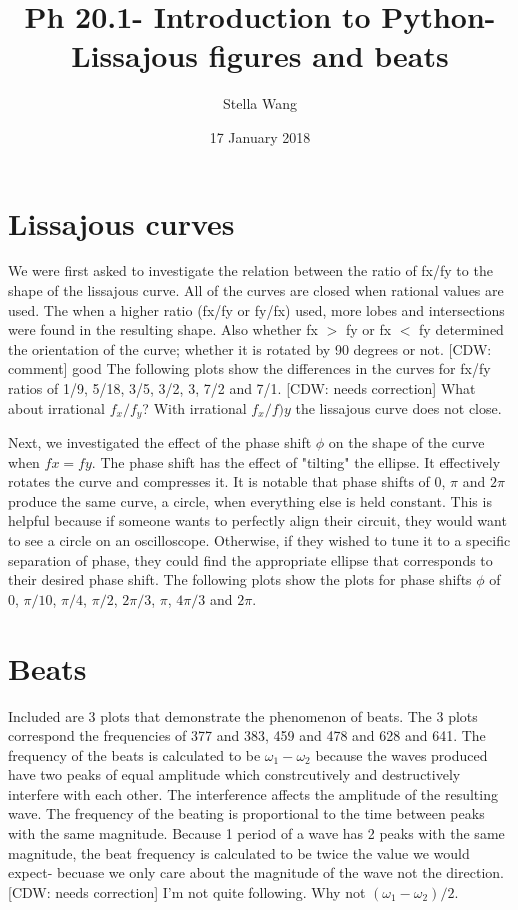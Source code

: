 \documentclass{article}
\title{Ph 20.1- Introduction to Python- Lissajous figures and beats
\\ \correct{}}
\author{Stella Wang}
\date{17 January 2018}
\newcommand{\cdw}[1]
           {{\color{blue} [CDW: comment] #1}}
\newcommand{\correct}[1]
           {{\color{red} [CDW: needs correction] #1}}
\begin{document}
	\maketitle
\section{Lissajous curves}
We were first asked to investigate the relation between the ratio of fx/fy to the shape of the lissajous curve. All of the curves are closed when rational values are used. The when a higher ratio (fx/fy or fy/fx) used, more lobes and intersections were found in the resulting shape. Also whether fx $>$ fy or fx $<$ fy determined the orientation of the curve; whether it is rotated by 90 degrees or not. \cdw{good} The following plots show the differences in the curves for fx/fy ratios of 1/9, 5/18, 3/5, 3/2, 3, 7/2 and 7/1.
\correct{What about irrational $f_x/f_y$?}
With irrational $f_x/f)y$ the lissajous curve does not close. 


Next, we investigated the effect of the phase shift $\phi$ on the shape of the curve when $fx=fy$. The phase shift has the effect of "tilting" the ellipse. It effectively rotates the curve and compresses it. It is notable that phase shifts of 0, $\pi$ and $2\pi$ produce the same curve, a circle, when everything else is held constant. This is helpful because if someone wants to perfectly align their circuit, they would want to see a circle on an oscilloscope. Otherwise, if they wished to tune it to a specific separation of phase, they could find the appropriate ellipse that corresponds to their desired phase shift. The following plots show the plots for phase shifts $\phi$ of 0, $\pi/10$, $\pi/4$, $\pi/2$, $2\pi/3$, $\pi$, $4\pi/3$ and $2\pi$.

 
 \section{Beats}
 Included are 3 plots that demonstrate the phenomenon of beats. The 3 plots correspond the frequencies of 377 and 383, 459 and 478 and 628 and 641. The frequency of the beats is calculated to be $\omega_1 - \omega_2$ because the waves produced have two peaks of equal amplitude which constrcutively and destructively interfere with each other. The interference affects the amplitude of the resulting wave. The frequency of the beating is proportional to the time between peaks with the same magnitude. Because 1 period of a wave has 2 peaks with the same magnitude, the beat frequency is calculated to be twice the value we would expect- becuase we only care about the magnitude of the wave not the direction. \correct{I'm not quite following. Why not $(\omega_1 - \omega_2)/2$}. 
 
\end{document}
